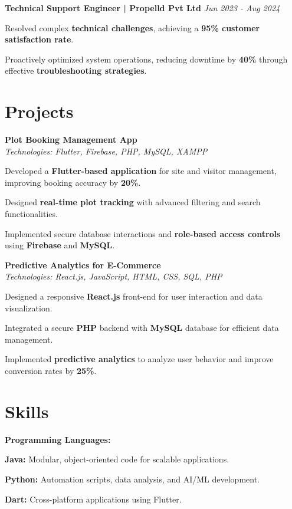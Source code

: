 \documentclass[a4paper,11pt]{article}
\begin{document}
\textbf{Technical Support Engineer | Propelld Pvt Ltd} \hfill \textit{Jun 2023 - Aug 2024} \\
\begin{compactitem}
    \item Resolved complex \textbf{technical challenges}, achieving a \textbf{95\% customer satisfaction rate}.
    \item Proactively optimized system operations, reducing downtime by \textbf{40\%} through effective \textbf{troubleshooting strategies}.
\end{compactitem}

\section*{Projects}

\textbf{Plot Booking Management App} \\
\textit{Technologies: Flutter, Firebase, PHP, MySQL, XAMPP} \\
\begin{compactitem}
    \item Developed a \textbf{Flutter-based application} for site and visitor management, improving booking accuracy by \textbf{20\%}.
    \item Designed \textbf{real-time plot tracking} with advanced filtering and search functionalities.
    \item Implemented secure database interactions and \textbf{role-based access controls} using \textbf{Firebase} and \textbf{MySQL}.
\end{compactitem}

\textbf{Predictive Analytics for E-Commerce} \\
\textit{Technologies: React.js, JavaScript, HTML, CSS, SQL, PHP} \\
\begin{compactitem}
    \item Designed a responsive \textbf{React.js} front-end for user interaction and data visualization.
    \item Integrated a secure \textbf{PHP} backend with \textbf{MySQL} database for efficient data management.
    \item Implemented \textbf{predictive analytics} to analyze user behavior and improve conversion rates by \textbf{25\%}.
\end{compactitem}

\section*{Skills}
\textbf{Programming Languages:} 
\begin{compactitem}
    \item \textbf{Java:} Modular, object-oriented code for scalable applications.
    \item \textbf{Python:} Automation scripts, data analysis, and AI/ML development.
    \item \textbf{Dart:} Cross-platform applications using Flutter.
\end{compactitem}
\end{document}
